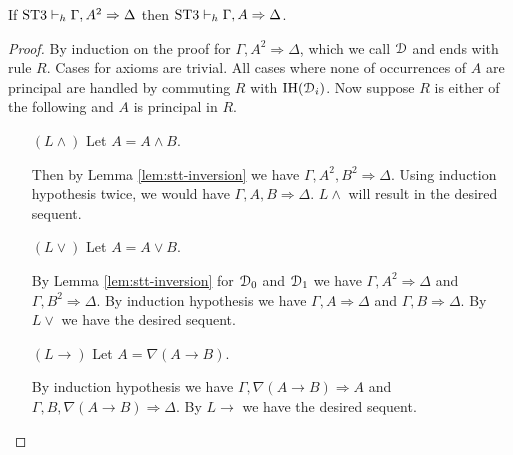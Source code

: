\documentclass[10pt,a4paper]{amsart}
\begin{document}
\begin{thm}[$Lc$]\label{thm:stt-lc-elim} If $\text{ST3} \vdash_h \Gamma, A^2 \Rightarrow \Delta$ then $\text{ST3} \vdash_h \Gamma, A \Rightarrow \Delta$.
\end{thm}
\begin{proof}
	By induction on the proof for $\Gamma, A^2 \Rightarrow \Delta$, which we call $\mathcal{D}$ and ends with rule $R$.
	Cases for axioms are trivial. All cases where none of occurrences of $A$ are principal are handled by commuting $R$ with $\text{IH}(\mathcal{D}_i)$. Now suppose $R$ is either of the following and $A$ is principal in $R$.
	\begin{itemize}
		\item[$(L \wedge)$] Let $A = A \wedge B$.
		\begin{prooftree}
			 \noLine
		\end{prooftree}
		Then by Lemma \ref{lem:stt-inversion} we have $\Gamma, A^2, B^2 \Rightarrow \Delta$. Using induction hypothesis twice, we would have $\Gamma, A, B \Rightarrow \Delta$. $L \wedge$ will result in the desired sequent.
	
		\item[$(L \vee)$] Let $A = A \vee B$.
		\begin{prooftree}
			 \noLine
			\UIC{$ \Gamma, A, A \vee B \Rightarrow \Delta$}
			 \noLine
			\UIC{$\Gamma, B, A \vee B \Rightarrow \Delta$}
			\RightLabel{$L \vee$}
			\BIC{$ \Gamma, (A \vee B)^2 \Rightarrow \Delta$}		
		\end{prooftree}
		By Lemma \ref{lem:stt-inversion} for $\mathcal{D}_0$ and $\mathcal{D}_1$ we have $\Gamma, A^2 \Rightarrow \Delta$ and $\Gamma, B^2 \Rightarrow \Delta$. By induction hypothesis we have $\Gamma, A \Rightarrow \Delta$ and $\Gamma, B \Rightarrow \Delta$. By $L \vee$ we have the desired sequent.
	
		\item[$(L \rightarrow)$] Let $A = \nabla (A \rightarrow B)$.
		\begin{prooftree}
			 \noLine
			\UIC{$\Gamma, (\nabla (A \rightarrow B))^2 \Rightarrow A$}
			 \noLine
			\UIC{$\Gamma, B, (\nabla (A \rightarrow B))^2 \Rightarrow \Delta$}
			\RightLabel{$L \rightarrow$}
			\BIC{$\Gamma, (\nabla (A \rightarrow B))^2 \Rightarrow \Delta$}
		\end{prooftree}
		By induction hypothesis we have $\Gamma, \nabla (A \rightarrow B) \Rightarrow A$ and $\Gamma, B, \nabla (A \rightarrow B) \Rightarrow \Delta$. By $L \rightarrow$ we have the desired sequent.
	\end{itemize}
\end{proof}
\end{document}
